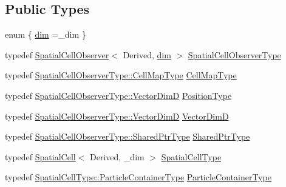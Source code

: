\subsection*{Public Types}
\begin{DoxyCompactItemize}
\item 
enum \{ \hyperlink{structmodel_1_1_spatial_cell_particle_af4baeffc63c7bfeec00f3f55e5ec69c0a5276346c81c3a25b32d005af29bb7a94}{dim} =\+\_\+dim
 \}
\item 
typedef \hyperlink{structmodel_1_1_spatial_cell_observer}{Spatial\+Cell\+Observer}$<$ Derived, \hyperlink{structmodel_1_1_spatial_cell_particle_af4baeffc63c7bfeec00f3f55e5ec69c0a5276346c81c3a25b32d005af29bb7a94}{dim} $>$ \hyperlink{structmodel_1_1_spatial_cell_particle_ad819afaadf1701d46001ccf094a2f677}{Spatial\+Cell\+Observer\+Type}
\item 
typedef \hyperlink{structmodel_1_1_spatial_cell_observer_a3ee3ac7a68725cbe49ef4ae951ce2231}{Spatial\+Cell\+Observer\+Type\+::\+Cell\+Map\+Type} \hyperlink{structmodel_1_1_spatial_cell_particle_ac41f685263028c4965edfcc89470e5f4}{Cell\+Map\+Type}
\item 
typedef \hyperlink{structmodel_1_1_spatial_cell_observer_a9b73220477f451fa7981e2597f23614b}{Spatial\+Cell\+Observer\+Type\+::\+Vector\+Dim\+D} \hyperlink{structmodel_1_1_spatial_cell_particle_a7ab8ba2de07a16fc3ec86b77c84581ab}{Position\+Type}
\item 
typedef \hyperlink{structmodel_1_1_spatial_cell_observer_a9b73220477f451fa7981e2597f23614b}{Spatial\+Cell\+Observer\+Type\+::\+Vector\+Dim\+D} \hyperlink{structmodel_1_1_spatial_cell_particle_a924d94d0c762c92744fae31f43b920e4}{Vector\+Dim\+D}
\item 
typedef \hyperlink{structmodel_1_1_spatial_cell_observer_ae879e58433ae1725fa700b08b790b2cd}{Spatial\+Cell\+Observer\+Type\+::\+Shared\+Ptr\+Type} \hyperlink{structmodel_1_1_spatial_cell_particle_af80891fc642ed8010429583dfb1b1009}{Shared\+Ptr\+Type}
\item 
typedef \hyperlink{structmodel_1_1_spatial_cell}{Spatial\+Cell}$<$ Derived, \+\_\+dim $>$ \hyperlink{structmodel_1_1_spatial_cell_particle_adddb2dcfb73964f57e72392f16346484}{Spatial\+Cell\+Type}
\item 
typedef \hyperlink{structmodel_1_1_spatial_cell_af69747431f1a63b915132ca461175826}{Spatial\+Cell\+Type\+::\+Particle\+Container\+Type} \hyperlink{structmodel_1_1_spatial_cell_particle_a80a6bdd90fd793b044a49fc6886480d0}{Particle\+Container\+Type}
\end{DoxyCompactItemize}
